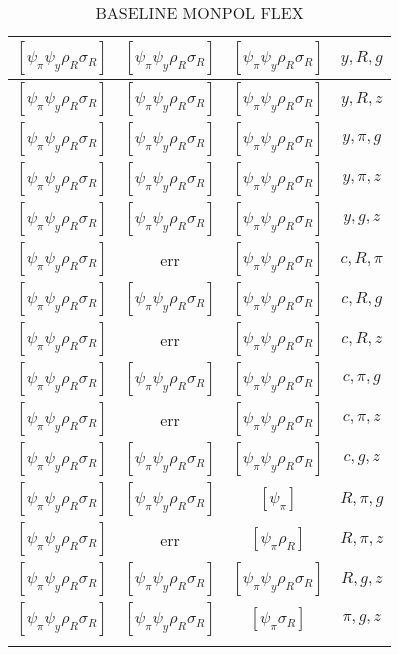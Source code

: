 \documentclass[a4paper,10pt]{article}
\begin{document}
\begin{longtable}{|c|c|c|c|}
\hline
$[\psi_\pi \psi_y \rho_R \sigma_R ]$ & $[\psi_\pi \psi_y \rho_R \sigma_R ]$ & $[\psi_\pi \psi_y \rho_R \sigma_R ]$ & ${y},{R},{g}$ \\
\hline
$[\psi_\pi \psi_y \rho_R \sigma_R ]$ & $[\psi_\pi \psi_y \rho_R \sigma_R ]$ & $[\psi_\pi \psi_y \rho_R \sigma_R ]$ & ${y},{R},{z}$ \\
\hline
$[\psi_\pi \psi_y \rho_R \sigma_R ]$ & $[\psi_\pi \psi_y \rho_R \sigma_R ]$ & $[\psi_\pi \psi_y \rho_R \sigma_R ]$ & ${y},{\pi},{g}$ \\
\hline
$[\psi_\pi \psi_y \rho_R \sigma_R ]$ & $[\psi_\pi \psi_y \rho_R \sigma_R ]$ & $[\psi_\pi \psi_y \rho_R \sigma_R ]$ & ${y},{\pi},{z}$ \\
\hline
$[\psi_\pi \psi_y \rho_R \sigma_R ]$ & $[\psi_\pi \psi_y \rho_R \sigma_R ]$ & $[\psi_\pi \psi_y \rho_R \sigma_R ]$ & ${y},{g},{z}$ \\
\hline
$[\psi_\pi \psi_y \rho_R \sigma_R ]$ & err & $[\psi_\pi \psi_y \rho_R \sigma_R ]$ & ${c},{R},{\pi}$ \\
\hline
$[\psi_\pi \psi_y \rho_R \sigma_R ]$ & $[\psi_\pi \psi_y \rho_R \sigma_R ]$ & $[\psi_\pi \psi_y \rho_R \sigma_R ]$ & ${c},{R},{g}$ \\
\hline
$[\psi_\pi \psi_y \rho_R \sigma_R ]$ & err & $[\psi_\pi \psi_y \rho_R \sigma_R ]$ & ${c},{R},{z}$ \\
\hline
$[\psi_\pi \psi_y \rho_R \sigma_R ]$ & $[\psi_\pi \psi_y \rho_R \sigma_R ]$ & $[\psi_\pi \psi_y \rho_R \sigma_R ]$ & ${c},{\pi},{g}$ \\
\hline
$[\psi_\pi \psi_y \rho_R \sigma_R ]$ & err & $[\psi_\pi \psi_y \rho_R \sigma_R ]$ & ${c},{\pi},{z}$ \\
\hline
$[\psi_\pi \psi_y \rho_R \sigma_R ]$ & $[\psi_\pi \psi_y \rho_R \sigma_R ]$ & $[\psi_\pi \psi_y \rho_R \sigma_R ]$ & ${c},{g},{z}$ \\
\hline
$[\psi_\pi \psi_y \rho_R \sigma_R ]$ & $[\psi_\pi \psi_y \rho_R \sigma_R ]$ & $[\psi_\pi ]$ & ${R},{\pi},{g}$ \\
\hline
$[\psi_\pi \psi_y \rho_R \sigma_R ]$ & err & $[\psi_\pi \rho_R ]$ & ${R},{\pi},{z}$ \\
\hline
$[\psi_\pi \psi_y \rho_R \sigma_R ]$ & $[\psi_\pi \psi_y \rho_R \sigma_R ]$ & $[\psi_\pi \psi_y \rho_R \sigma_R ]$ & ${R},{g},{z}$ \\
\hline
$[\psi_\pi \psi_y \rho_R \sigma_R ]$ & $[\psi_\pi \psi_y \rho_R \sigma_R ]$ & $[\psi_\pi \sigma_R ]$ & ${\pi},{g},{z}$ \\
\hline
\caption{BASELINE MONPOL FLEX}
\label{table:MyTableLabel}
\end{longtable}
\end{document}
